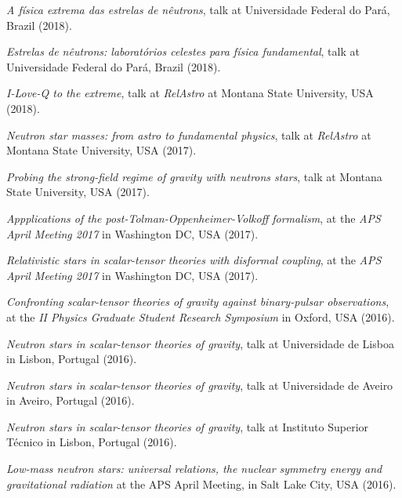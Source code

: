 \documentclass[10pt]{article}
\newcommand{\invited}{{\color{aeilbl}{invited}}}
\begin{document}
\begin{bibenum}
    \item
    \emph{A f\'isica extrema das estrelas de n\^eutrons},
    \invited{} talk at Universidade Federal do Par\'a, Brazil (2018).

    \item
    \emph{Estrelas de n\^eutrons: laborat\'orios celestes para f\'isica fundamental},
    \invited{} talk at Universidade Federal do Par\'a, Brazil (2018).

    \item
    \emph{I-Love-Q to the extreme},
    talk at \emph{RelAstro} at Montana State University, USA (2018).

    \item
    \emph{Neutron star masses: from astro to fundamental physics},
    talk at \emph{RelAstro} at Montana State University, USA (2017).

    \item
    \emph{Probing the strong-field regime of gravity with neutrons stars},
    \invited{} talk at Montana State University, USA (2017).

    \item
    \emph{Appplications of the post-Tolman-Oppenheimer-Volkoff formalism},
    at the \emph{APS April Meeting 2017}
    in Washington DC, USA (2017).

    \item
    \emph{Relativistic stars in scalar-tensor theories with disformal coupling},
    at the \emph{APS April Meeting 2017}
    in Washington DC, USA (2017).

    \item
    \emph{Confronting scalar-tensor theories of gravity
    against binary-pulsar observations},
    at the \emph{II Physics Graduate Student Research Symposium}
    in Oxford, USA (2016).

    \item
    \emph{Neutron stars in scalar-tensor theories of gravity},
    \invited{} talk at Universidade de Lisboa
    in Lisbon, Portugal (2016).

    \item
    \emph{Neutron stars in scalar-tensor theories of gravity},
    \invited{} talk at Universidade de Aveiro
    in Aveiro, Portugal (2016).

    \item
    \emph{Neutron stars in scalar-tensor theories of gravity},
    \invited{} talk at Instituto Superior T\'ecnico
    in Lisbon, Portugal (2016).

    \item
    \emph{Low-mass neutron stars: universal relations, the nuclear symmetry energy and gravitational radiation}
    at the {APS April Meeting},
    in Salt Lake City, USA (2016).


\end{bibenum}
\end{document}
